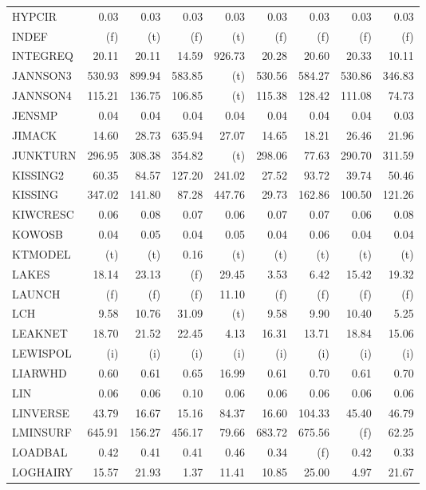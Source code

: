 \documentclass[11pt,twoside]{article}
\begin{document}
{\begin{longtable}[c]{|l|r|r|r|r|r|r|r|r|}
HYPCIR & 0.03 & 0.03 & 0.03 & 0.03 & 0.03 & 0.03 & 0.03 & 0.03 \\
INDEF & (f) & (t) & (f) & (t) & (f) & (f) & (f) & (f) \\
INTEGREQ & 20.11 & 20.11 & 14.59 & 926.73 & 20.28 & 20.60 & 20.33 & 10.11 \\
JANNSON3 & 530.93 & 899.94 & 583.85 & (t) & 530.56 & 584.27 & 530.86 & 346.83 \\
JANNSON4 & 115.21 & 136.75 & 106.85 & (t) & 115.38 & 128.42 & 111.08 & 74.73 \\
JENSMP & 0.04 & 0.04 & 0.04 & 0.04 & 0.04 & 0.04 & 0.04 & 0.03 \\
JIMACK & 14.60 & 28.73 & 635.94 & 27.07 & 14.65 & 18.21 & 26.46 & 21.96 \\
JUNKTURN & 296.95 & 308.38 & 354.82 & (t) & 298.06 & 77.63 & 290.70 & 311.59 \\
KISSING2 & 60.35 & 84.57 & 127.20 & 241.02 & 27.52 & 93.72 & 39.74 & 50.46 \\
KISSING & 347.02 & 141.80 & 87.28 & 447.76 & 29.73 & 162.86 & 100.50 & 121.26 \\
KIWCRESC & 0.06 & 0.08 & 0.07 & 0.06 & 0.07 & 0.07 & 0.06 & 0.08 \\
KOWOSB & 0.04 & 0.05 & 0.04 & 0.05 & 0.04 & 0.06 & 0.04 & 0.04 \\
KTMODEL & (t) & (t) & 0.16 & (t) & (t) & (t) & (t) & (t) \\
LAKES & 18.14 & 23.13 & (f) & 29.45 & 3.53 & 6.42 & 15.42 & 19.32 \\
LAUNCH & (f) & (f) & (f) & 11.10 & (f) & (f) & (f) & (f) \\
LCH & 9.58 & 10.76 & 31.09 & (t) & 9.58 & 9.90 & 10.40 & 5.25 \\
LEAKNET & 18.70 & 21.52 & 22.45 & 4.13 & 16.31 & 13.71 & 18.84 & 15.06 \\
LEWISPOL & (i) & (i) & (i) & (i) & (i) & (i) & (i) & (i) \\
LIARWHD & 0.60 & 0.61 & 0.65 & 16.99 & 0.61 & 0.70 & 0.61 & 0.70 \\
LIN & 0.06 & 0.06 & 0.10 & 0.06 & 0.06 & 0.06 & 0.06 & 0.06 \\
LINVERSE & 43.79 & 16.67 & 15.16 & 84.37 & 16.60 & 104.33 & 45.40 & 46.79 \\
LMINSURF & 645.91 & 156.27 & 456.17 & 79.66 & 683.72 & 675.56 & (f) & 62.25 \\
LOADBAL & 0.42 & 0.41 & 0.41 & 0.46 & 0.34 & (f) & 0.42 & 0.33 \\
LOGHAIRY & 15.57 & 21.93 & 1.37 & 11.41 & 10.85 & 25.00 & 4.97 & 21.67 \\

\end{longtable}}
\end{document}

